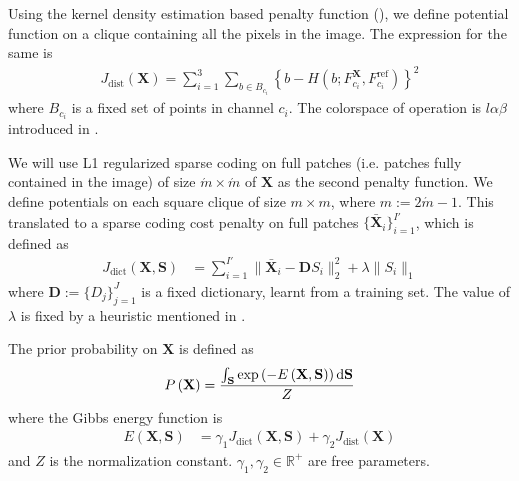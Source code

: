 Using the kernel density estimation based penalty function (), we define potential function on a clique containing all the pixels in the image. The expression for the same is
\begin{align}
J_\text{dist}(\mathbf{X}) = \sum_{i=1}^{3} \sum_{b \in B_{c_i}} \left\lbrace b - H \left( b; F^\mathbf{X}_{c_i}, F^\text{ref}_{c_i} \right) \right\rbrace^2 \label{eqn:cost_kde}
\end{align}
where $B_{c_i}$ is a fixed set of points in channel $c_i$. The colorspace of operation is $l\alpha\beta$ introduced in .

We will use L1 regularized sparse coding on full patches (i.e. patches fully contained in the image) of size $\acute{m} \times \acute{m}$ of $\mathbf{X}$ as the second penalty function. We define potentials on each square clique of size $m \times m$, where $m := 2\acute{m} - 1$. This translated to a sparse coding cost penalty on full patches $\lbrace \mathbf{\bar X}_i \rbrace_{i=1}^{I'}$, which is defined as
\begin{align}
    J_\text{dict} \left( \mathbf{X}, \mathbf{S} \right) &= \sum_{i=1}^{I'} \| \mathbf{\bar X}_i - \mathbf{D} S_i \|_2^2 + \lambda \| S_i \|_1 \label{eqn:dictCost}
\end{align}
where $\mathbf{D} := \lbrace D_j \rbrace_{j=1}^{J}$ is a fixed dictionary, learnt from a training set. The value of $\lambda$ is fixed by a heuristic mentioned in \cite{mairal2009online}.

The prior probability on $\mathbf{X}$ is defined as 
\begin{align}
    P\left( \mathbf{X} \right) = \frac{\int_{\mathbf{S}} \exp \left( -E\left(\mathbf{X}, \mathbf{S} \right) \right) \mathop{}\!\mathrm{d} \mathbf{S}}{Z}
\end{align}
where the Gibbs energy function is
\begin{align}
    E \left(\mathbf{X}, \mathbf{S} \right) &= \gamma_1 J_\text{dict} \left( \mathbf{X}, \mathbf{S} \right) + \gamma_2 J_\text{dist} \left( \mathbf{X} \right)
\end{align}
and $Z$ is the normalization constant. $\gamma_1, \gamma_2 \in \mathbb{R}^+$ are free parameters.

